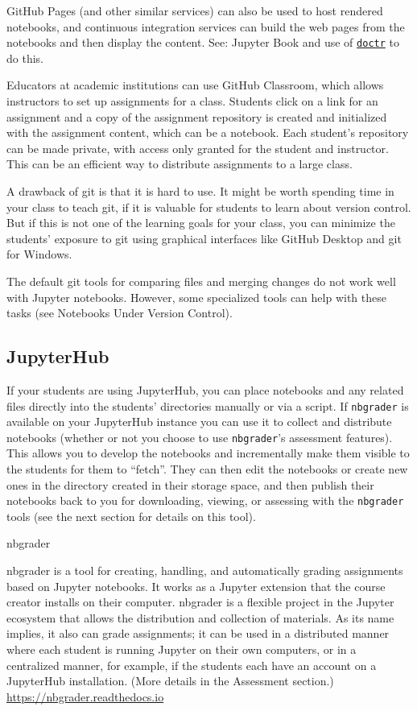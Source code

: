 \documentclass[]{book}
\let\BeginKnitrBlock\begin \let\EndKnitrBlock\end
\begin{document}
GitHub Pages (and other similar services) can also be used to host rendered
notebooks, and continuous integration services can build the web pages
from the notebooks and then display the content. See: Jupyter Book and use of
\href{https://drdoctr.github.io/doctr}{\texttt{doctr}} to do this.

Educators at academic institutions can use GitHub Classroom, which
allows instructors to set up assignments for a class. Students click
on a link for an assignment and a copy of the assignment repository is
created and initialized with the assignment content, which can be a
notebook. Each student's repository can be made private, with access
only granted for the student and instructor. This can be an efficient
way to distribute assignments to a large class.

A drawback of git is that it is hard to use. It might be worth
spending time in your class to teach git, if it is valuable for
students to learn about version control. But if this is not one of
the learning goals for your class, you can minimize the students'
exposure to git using graphical interfaces like GitHub Desktop and git
for Windows.

The default git tools for comparing files and merging changes do not
work well with Jupyter notebooks. However, some specialized
tools can help with these tasks (see Notebooks Under Version Control).

\hypertarget{jupyterhub}{%
\subsection{JupyterHub}\label{jupyterhub}}

If your students are using JupyterHub, you can place notebooks and any
related files directly into the students' directories manually or via
a script. If \texttt{nbgrader} is available on your JupyterHub instance you
can use it to collect and distribute notebooks (whether or not you
choose to use \texttt{nbgrader}'s assessment features). This allows you to
develop the notebooks and incrementally make them visible to the
students for them to ``fetch''. They can then edit the notebooks or
create new ones in the directory created in their storage space, and
then publish their notebooks back to you for downloading, viewing, or
assessing with the \texttt{nbgrader} tools (see the next section for details on
this tool).

\BeginKnitrBlock{rmdnote}
nbgrader

nbgrader is a tool for creating, handling,
and automatically grading assignments based on Jupyter
notebooks. It works as a Jupyter extension that the course
creator installs on their computer. nbgrader is a flexible
project in the Jupyter ecosystem that allows the distribution
and collection of materials. As its name implies, it also can
grade assignments; it can be used in a distributed manner where
each student is running Jupyter on their own computers, or in a
centralized manner, for example, if the students each have an
account on a JupyterHub installation. (More details in the
Assessment section.) \url{https://nbgrader.readthedocs.io}
\EndKnitrBlock{rmdnote}
\end{document}
